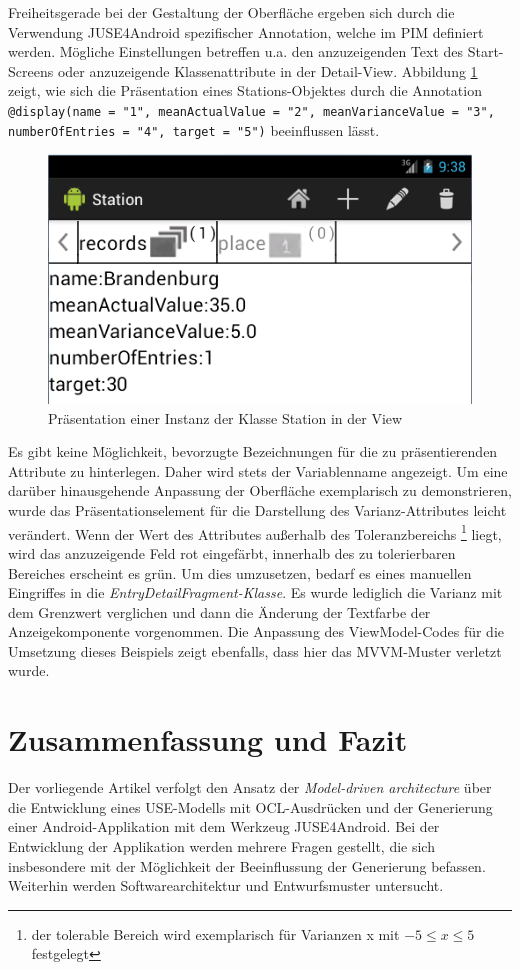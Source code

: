 \documentclass[a4paper,twoside]{article}
\begin{document}
Freiheitsgerade bei der Gestaltung der Oberfläche ergeben sich durch die Verwendung JUSE4Android spezifischer Annotation, welche im PIM definiert werden. Mögliche Einstellungen betreffen u.a. den anzuzeigenden Text des Start-Screens oder anzuzeigende Klassenattribute in der Detail-View. \cite[S.19]{SilvaMasterThesis} Abbildung \ref{fig:StationView} zeigt, wie sich die Präsentation eines Stations-Objektes durch die Annotation \texttt{@display(name = "1", meanActualValue = "2", meanVarianceValue = "3", numberOfEntries = "4", target = "5")} beeinflussen lässt.
\begin{figure}[!h]
	\centering
	\includegraphics[scale=.6]{pics/StationView.png}
	\caption{Präsentation einer Instanz der Klasse Station in der View}
	\label{fig:StationView}
\end{figure}
Es gibt keine Möglichkeit, bevorzugte Bezeichnungen für die zu präsentierenden Attribute zu hinterlegen. Daher wird stets der Variablenname angezeigt. 
Um eine darüber hinausgehende Anpassung der Oberfläche exemplarisch zu demonstrieren, wurde das Präsentationselement für die Darstellung des Varianz-Attributes leicht verändert. Wenn der Wert des Attributes außerhalb des Toleranzbereichs \footnote{der tolerable Bereich wird exemplarisch für Varianzen x mit \(-5 \le x \le 5\) festgelegt} liegt, wird das anzuzeigende Feld rot eingefärbt, innerhalb des zu tolerierbaren Bereiches erscheint es grün. Um dies umzusetzen, bedarf es eines manuellen Eingriffes in die \textit{EntryDetailFragment-Klasse}. Es wurde lediglich die Varianz mit dem Grenzwert verglichen und dann die Änderung der Textfarbe der Anzeigekomponente vorgenommen. Die Anpassung des ViewModel-Codes für die Umsetzung dieses Beispiels zeigt ebenfalls, dass hier das MVVM-Muster verletzt wurde.

\section{Zusammenfassung und Fazit}
Der vorliegende Artikel verfolgt den Ansatz der \textit{Model-driven architecture} über die Entwicklung eines USE-Modells mit OCL-Ausdrücken und der Generierung einer Android-Applikation mit dem Werkzeug JUSE4Android. Bei der Entwicklung der Applikation werden mehrere Fragen gestellt, die sich insbesondere mit der Möglichkeit der Beeinflussung der Generierung befassen. Weiterhin werden Softwarearchitektur und Entwurfsmuster untersucht. 
\\
\end{document}
